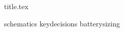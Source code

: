 \documentclass{article}
\begin{document}
{title.tex}

\tableofcontents

{schematics}
{keydecisions}
{batterysizing}

\printbibliography
\end{document}
